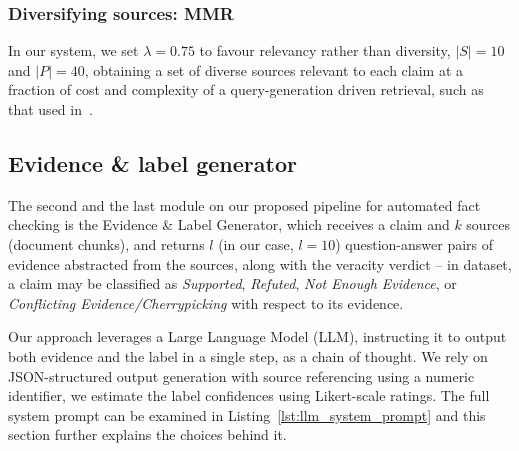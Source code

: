 \subsubsection{Diversifying sources: MMR}

In our system, we set $\lambda=0.75$ to favour relevancy rather than diversity, $|S|=10$ and $|P| = 40$, obtaining a set of diverse sources relevant to each claim at a fraction of cost and complexity of a query-generation driven retrieval, such as that used in~\cite{averitec2024}.

\subsection{Evidence \& label generator}
\label{sec:generation}
The second and the last module on our proposed pipeline for automated fact checking is the Evidence \& Label Generator, which receives a claim and $k$ sources (document chunks), and returns $l$ (in our case, $l=10$) question-answer pairs of evidence abstracted from the sources, along with the veracity verdict -- in \averitec{} dataset, a claim may be classified as \textit{Supported}, \textit{Refuted}, \textit{Not Enough Evidence}, or \textit{Conflicting Evidence/Cherrypicking} with respect to its evidence.

Our approach leverages a Large Language Model (LLM), instructing it to output both evidence and the label in a single step, as a chain of thought.
We rely on JSON-structured output generation with source referencing using a numeric identifier, we estimate the label confidences using Likert-scale ratings.
The full system prompt can be examined in Listing~\ref{lst:llm_system_prompt}  and this section further explains the choices behind it.


